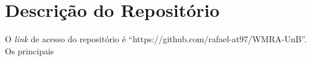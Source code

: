 
\chapter{Descrição do Repositório}

\label{Anexo-Repositorio}

O \textit{link} de acesso do repositório é ``https://github.com/rafael-at97/WMRA-UnB''. Os
principais 
